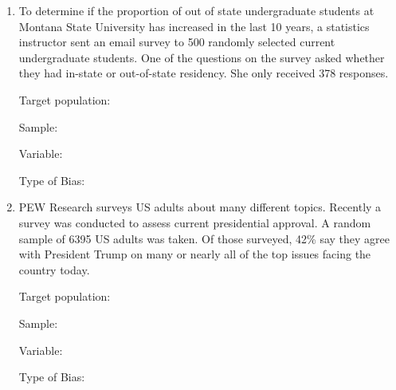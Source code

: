 \documentclass[
]{report}
\begin{document}
\begin{enumerate}
\def\labelenumi{\arabic{enumi}.}
\item
  To determine if the proportion of out of state undergraduate students at Montana State University has increased in the last 10 years, a statistics instructor sent an email survey to 500 randomly selected current undergraduate students. One of the questions on the survey asked whether they had in-state or out-of-state residency. She only received 378 responses.
  \vspace{0.25in}

  Target population:
  \vspace{0.3in}

  Sample:
  \vspace{0.3in}

  Variable:
  \vspace{0.3in}

  Type of Bias:
  \vspace{0.3in}
\item
  PEW Research surveys US adults about many different topics. Recently a survey was conducted to assess current presidential approval. A random sample of 6395 US adults was taken. Of those surveyed, 42\% say they agree with President Trump on many or nearly all of the top issues facing the country today.
  \vspace{0.25in}

  Target population:
  \vspace{0.3in}

  Sample:
  \vspace{0.3in}

  Variable:
  \vspace{0.3in}

  Type of Bias:
  \vspace{0.3in}
\end{enumerate}

\newpage
\end{document}
